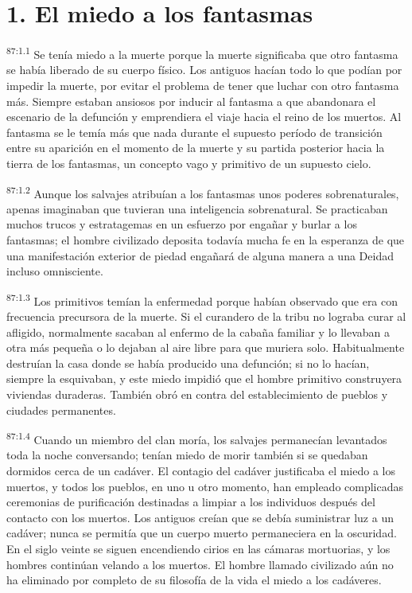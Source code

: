 \documentclass[twoside, 11pt]{book}
\begin{document}
\section*{1. El miedo a los fantasmas}
\par
\textsuperscript{87:1.1} Se tenía miedo a la muerte porque la muerte significaba que otro fantasma se había liberado de su cuerpo físico. Los antiguos hacían todo lo que podían por impedir la muerte, por evitar el problema de tener que luchar con otro fantasma más. Siempre estaban ansiosos por inducir al fantasma a que abandonara el escenario de la defunción y emprendiera el viaje hacia el reino de los muertos. Al fantasma se le temía más que nada durante el supuesto período de transición entre su aparición en el momento de la muerte y su partida posterior hacia la tierra de los fantasmas, un concepto vago y primitivo de un supuesto cielo.

\par
\textsuperscript{87:1.2} Aunque los salvajes atribuían a los fantasmas unos poderes sobrenaturales, apenas imaginaban que tuvieran una inteligencia sobrenatural. Se practicaban muchos trucos y estratagemas en un esfuerzo por engañar y burlar a los fantasmas; el hombre civilizado deposita todavía mucha fe en la esperanza de que una manifestación exterior de piedad engañará de alguna manera a una Deidad incluso omnisciente.

\par
\textsuperscript{87:1.3} Los primitivos temían la enfermedad porque habían observado que era con frecuencia precursora de la muerte. Si el curandero de la tribu no lograba curar al afligido, normalmente sacaban al enfermo de la cabaña familiar y lo llevaban a otra más pequeña o lo dejaban al aire libre para que muriera solo. Habitualmente destruían la casa donde se había producido una defunción; si no lo hacían, siempre la esquivaban, y este miedo impidió que el hombre primitivo construyera viviendas duraderas. También obró en contra del establecimiento de pueblos y ciudades permanentes.

\par
\textsuperscript{87:1.4} Cuando un miembro del clan moría, los salvajes permanecían levantados toda la noche conversando; tenían miedo de morir también si se quedaban dormidos cerca de un cadáver. El contagio del cadáver justificaba el miedo a los muertos, y todos los pueblos, en uno u otro momento, han empleado complicadas ceremonias de purificación destinadas a limpiar a los individuos después del contacto con los muertos. Los antiguos creían que se debía suministrar luz a un cadáver; nunca se permitía que un cuerpo muerto permaneciera en la oscuridad. En el siglo veinte se siguen encendiendo cirios en las cámaras mortuorias, y los hombres continúan velando a los muertos. El hombre llamado civilizado aún no ha eliminado por completo de su filosofía de la vida el miedo a los cadáveres.
\end{document}
